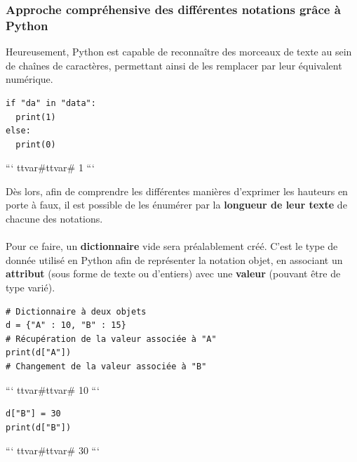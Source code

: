 \documentclass[
  11pt,
  french,
]{article}
\begin{document}
\hypertarget{approche-compruxe9hensive-des-diffuxe9rentes-notations-gruxe2ce-uxe0-python}{%
\subsubsection{Approche compréhensive des différentes notations grâce à
Python}\label{approche-compruxe9hensive-des-diffuxe9rentes-notations-gruxe2ce-uxe0-python}}

Heureusement, Python est capable de reconnaître des morceaux de texte au
sein de chaînes de caractères, permettant ainsi de les remplacer par
leur équivalent numérique.

\begin{tcolorbox}[title= Chargement du jeu de données sous un format géographique dans Python ,colback=boitecode]
\begin{lstlisting}[style=code]
if "da" in "data":
  print(1)
else:
  print(0)\end{lstlisting}

```
ttvar{#}ttvar{#} 1
```

\end{tcolorbox}

Dès lors, afin de comprendre les différentes manières d'exprimer les
hauteurs en porte à faux, il est possible de les énumérer par la
\textbf{longueur de leur texte} de chacune des notations.\\
~\\
Pour ce faire, un \textbf{dictionnaire} vide sera préalablement créé.
C'est le type de donnée utilisé en Python afin de représenter la
notation objet, en associant un \textbf{attribut} (sous forme de texte
ou d'entiers) avec une \textbf{valeur} (pouvant être de type varié).

\begin{tcolorbox}[title= Chargement du jeu de données sous un format géographique dans Python ,colback=boitecode]
\begin{lstlisting}[style=code]
# Dictionnaire à deux objets
d = {"A" : 10, "B" : 15}
# Récupération de la valeur associée à "A"
print(d["A"])
# Changement de la valeur associée à "B"\end{lstlisting}

```
ttvar{#}ttvar{#} 10
```

\begin{lstlisting}[style=code]
d["B"] = 30
print(d["B"])\end{lstlisting}

```
ttvar{#}ttvar{#} 30
```

\end{tcolorbox}
\end{document}
